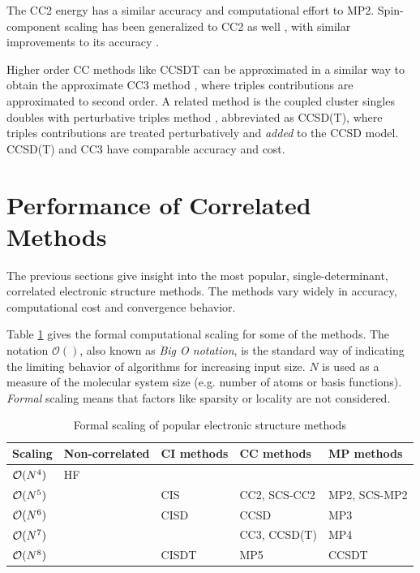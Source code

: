 The CC2 energy has a similar accuracy and computational effort to MP2. Spin-component scaling has been generalized to CC2 as well \cite{Hel2008,Win2011}, with similar improvements to its accuracy \cite{Taj2019}. 

Higher order CC methods like CCSDT can be approximated in a similar way to obtain the approximate CC3 method \cite{Koc1997}, where triples contributions are approximated to second order. A related method is the coupled cluster singles doubles with perturbative triples method \cite{Rag1989}, abbreviated as CCSD(T), where triples contributions are treated perturbatively and \emph{added} to the CCSD model. CCSD(T) and CC3 have comparable accuracy and cost. 


\section{Performance of Correlated Methods}

The previous sections give insight into the most popular, single-determinant, correlated electronic structure methods. The methods vary widely in accuracy, computational cost and convergence behavior. 

Table \ref{tab:SCALINGS} gives the formal computational scaling for some of the methods. The notation $\mathcal{O}()$, also known as \emph{Big O notation}, is the standard way of indicating the limiting behavior of algorithms for increasing input size. $N$ is used as a measure of the molecular system size (e.g. number of atoms or basis functions). \emph{Formal} scaling means that factors like sparsity or locality are not considered.

\begin{table}
\centering
\begin{tabular}{lllll} 
\hline 
Scaling & Non-correlated & CI methods & CC methods & MP methods \\ \hline
$\mathcal{O}(N^{4})$ & HF &  &  &  \\
$\mathcal{O}(N^{5})$ & & CIS & CC2, SCS-CC2 & MP2, SCS-MP2 \\
$\mathcal{O}(N^{6})$ & & CISD & CCSD & MP3 \\
$\mathcal{O}(N^{7})$ & & & CC3, CCSD(T) & MP4 \\
$\mathcal{O}(N^{8})$ & & CISDT & MP5 & CCSDT \\
\hline 
\end{tabular}
\label{tab:SCALINGS}
\caption{Formal scaling of popular electronic structure methods}
\end{table}

